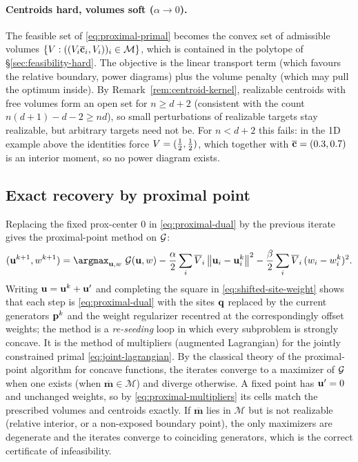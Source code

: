 \documentclass[main.tex]{subfiles}
\providecommand{\momset}{\mathcal{M}}            %
\providecommand{\tmom}{\overline{\mathbf{m}}}    %
\begin{document}
\paragraph{Centroids hard, volumes soft ($\alpha \to 0$).}
The feasible set of \eqref{eq:proximal-primal} becomes the convex set of admissible volumes $\{\cellvol : ((\cellvol_i\tcentroid_i, \cellvol_i))_i \in \momset\}$, which is contained in the polytope of \S\ref{sec:feasibility-hard}.
The objective is the linear transport term (which favours the relative boundary, \ie power diagrams) plus the volume penalty (which may pull the optimum inside).
By Remark~\ref{rem:centroid-kernel}, realizable centroids with free volumes form an open set for $n \ge d + 2$ (consistent with the count $n(d+1) - d - 2 \ge nd$), so small perturbations of realizable targets stay realizable, but arbitrary targets need not be.
For $n < d + 2$ this fails: in the 1D example above the identities force $V = (\tfrac12, \tfrac12)$, which together with $\overline{\mathbf{c}} = (0.3, 0.7)$ is an interior moment, so no power diagram exists.

\subsection{Exact recovery by proximal point}
\label{sec:proximal-point}

Replacing the fixed prox-center $0$ in \eqref{eq:proximal-dual} by the previous iterate gives the proximal-point method on $\mathcal{G}$:
\begin{equation}
  (\shift^{k+1}, \weight^{k+1})
  = \argmax_{\shift, \weight} \
  \jointdual(\shift, \weight)
  - \frac{\alpha}{2} \sum_i \pvol_i \norm{\shift_i - \shift_i^k}^2
  - \frac{\beta}{2} \sum_i \pvol_i \, (\weight_i - \weight_i^k)^2 .
  \label{eq:proximal-point}
\end{equation}
Writing $\mathbf{u} = \mathbf{u}^k + \mathbf{u}'$ and completing the square in \eqref{eq:shifted-site-weight} shows that each step is \eqref{eq:proximal-dual} with the sites $\mathbf{q}$ replaced by the current generators $\mathbf{p}^k$ and the weight regularizer recentred at the correspondingly offset weights; the method is a \emph{re-seeding} loop in which every subproblem is strongly concave.
It is the method of multipliers (augmented Lagrangian) for the jointly constrained primal \eqref{eq:joint-lagrangian}.
By the classical theory of the proximal-point algorithm for concave functions, the iterates converge to a maximizer of $\mathcal{G}$ when one exists (\ie when $\tmom \in \momset$) and diverge otherwise.
A fixed point has $\mathbf{u}' = 0$ and unchanged weights, so by \eqref{eq:proximal-multipliers} its cells match the prescribed volumes and centroids exactly.
If $\tmom$ lies in $\momset$ but is not realizable (relative interior, or a non-exposed boundary point), the only maximizers are degenerate and the iterates converge to coinciding generators, which is the correct certificate of infeasibility.
\end{document}
